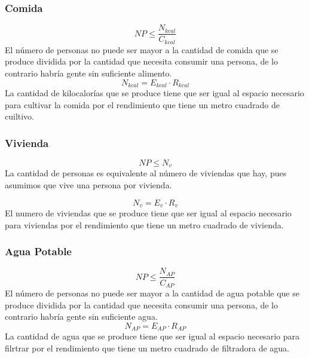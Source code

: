 \documentclass[12pt]{report}
\begin{document}
\subsubsection*{Comida}
$$NP \leq \frac{N_{kcal}}{C_{kcal}}$$
El n\'umero de personas no puede ser mayor a la cantidad de comida que se produce dividida por la cantidad que necesita consumir una persona, de lo contrario habr\'ia gente sin suficiente alimento. 
\\
$$N_{kcal} = E_{kcal} \cdot R_{kcal}$$
La cantidad de kilocalor\'ias que se produce tiene que ser igual al espacio necesario para cultivar la comida por el rendimiento que tiene un metro cuadrado de cuiltivo.
\\
\newpage
\subsubsection*{Vivienda}

$$NP \leq N_{v}$$
La cantidad de personas es equivalente al n\'umero de viviendas que hay, pues asumimos que vive una persona por  vivienda.

$$N_{v} = E_{v} \cdot R_{v}$$
El numero de viviendas que se produce tiene que ser igual al espacio necesario para viviendas por el rendimiento que tiene un metro cuadrado de vivienda.
\subsubsection*{Agua Potable}
$$NP \leq \frac{N_{AP}}{C_{AP}}$$
El n\'umero de personas no puede ser mayor a la cantidad de agua potable que se produce dividida por la cantidad que necesita consumir una persona, de lo contrario habr\'ia gente sin suficiente agua.
\\
$$N_{AP} = E_{AP} \cdot R_{AP}$$
La cantidad de agua que se produce tiene que ser igual al espacio necesario para filrtrar  por el rendimiento que tiene un metro cuadrado de filtradora de agua.
\\
\end{document}
